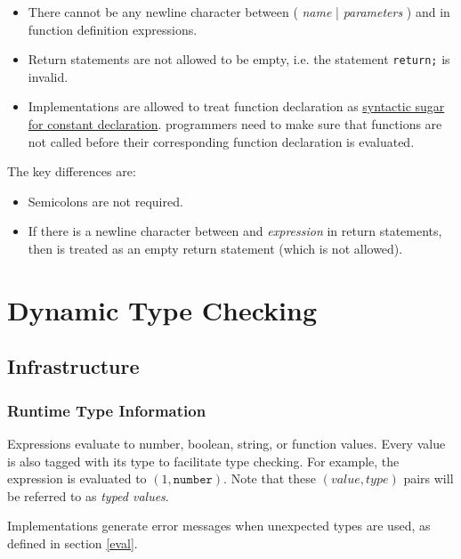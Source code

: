 \begin{itemize}
    \item There cannot be any newline character between ( \textit{name} | \code{(} \textit{parameters} \code{)} ) and \code{=>} in function
definition expressions.
    \item Return statements are not allowed to be empty, i.e. the statement \verb|return;| is invalid.

    \item Implementations are allowed to treat function declaration as \href{https://source-academy.github.io/sicp/chapters/1.3.2.html#footnote-2}{syntactic sugar for constant declaration}. 
    \DynamicTS{} programmers need to make sure that functions are not called before their corresponding function declaration is evaluated.
\end{itemize}

The key differences are:
\begin{itemize}
    \item Semicolons are not required.
    \item If there is a newline character between  and \textit{expression} in return statements, 
    then  is treated as an empty return statement (which is not allowed).
\end{itemize}



\section{Dynamic Type Checking}

\subsection{Infrastructure}

\subsubsection*{Runtime Type Information}

Expressions evaluate to number, boolean, string, or function values. 
Every value is also tagged with its type to facilitate type checking.
For example, the expression  is evaluated to $(1, \texttt{number})$.
Note that these $(\textit{value}, \textit{type})$ pairs will be referred to as \textit{typed values}.

Implementations generate error messages when unexpected types are used, as defined in section \ref{eval}.

